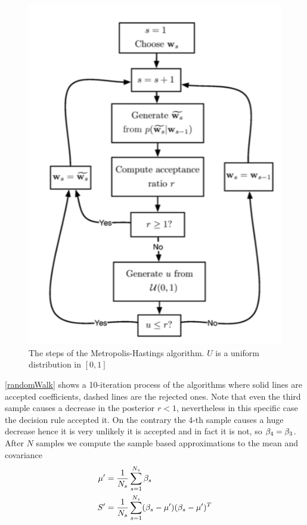 \begin{figure}
\centering
\includegraphics[scale=0.45]{img/MHAlgo}
\caption{The steps of the Metropolis-Hastings algorithm. $U$ is a uniform distribution in $[0,1]$}
\label{MHAlgo}
\end{figure}

\autoref{randomWalk} shows a 10-iteration process of the algorithms where solid lines are accepted coefficients, dashed lines are the rejected ones. Note that even the third sample causes a decrease in the posterior $r<1$, nevertheless in this specific case the decision rule accepted it. On the contrary the 4-th sample causes a huge decrease hence it is very unlikely it is accepted and in fact it is not, so $\mathbf{\beta}_4 = \mathbf{\beta}_3$. After $N$ samples we compute the sample based approximations to the mean and covariance
\begin{equation}
\begin{aligned}
\mu' &= \frac{1}{N_s} \sum_{s=1}^{N_s} \mathbf{\beta}_s\\
S' &= \frac{1}{N_s} \sum_{s=1}^{N_s} (\mathbf{\beta}_s-\mu')(\mathbf{\beta}_s-\mu')^T
\end{aligned}
\end{equation}

